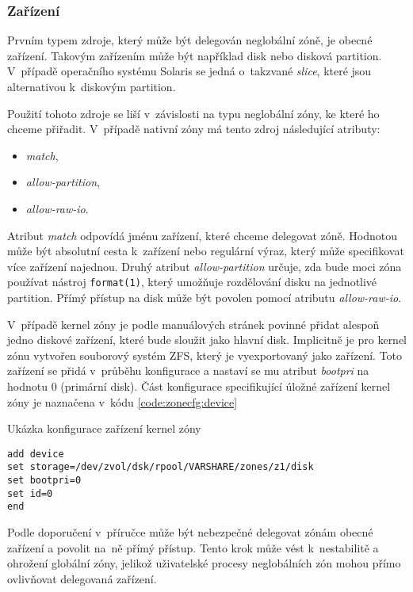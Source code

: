 \subsubsection{Zařízení}
\label{chapter:zones:configuration:resources:device}
Prvním typem zdroje, který může být delegován neglobální zóně, je obecné zařízení. Takovým zařízením může být například disk
nebo disková partition. V~případě operačního systému Solaris se jedná o~takzvané \textit{slice}, které jsou alternativou k~diskovým 
partition. 

Použití tohoto zdroje se liší v~závislosti na typu neglobální zóny, ke které ho chceme přiřadit. V~případě nativní zóny má tento
zdroj následující  atributy:
\begin{itemize}
 \item \textit{match},
 \item \textit{allow-partition},
 \item \textit{allow-raw-io}.
\end{itemize}
Atribut \textit{match} odpovídá jménu zařízení, které chceme delegovat zóně. Hodnotou může být absolutní cesta k~zařízení nebo
regulární výraz, který může specifikovat více zařízení najednou. Druhý atribut \textit{allow-partition} určuje, zda 
bude moci zóna používat nástroj \verb|format(1)|, který umožňuje rozdělování disku na jednotlivé partition. Přímý přístup na disk
může být povolen pomocí atributu \textit{allow-raw-io}.

V~případě kernel zóny je podle manuálových stránek \cite{oracle:manpages:solaris-kz} povinné přidat alespoň jedno diskové zařízení,
které bude sloužit jako hlavní disk. Implicitně je pro kernel zónu vytvořen souborový systém ZFS, který je vyexportovaný jako
zařízení. Toto zařízení se přidá v~průběhu konfigurace a nastaví se mu atribut \textit{bootpri} na hodnotu 0 (primární disk).
Část konfigurace specifikující úložné zařízení kernel zóny je naznačena v~kódu \ref{code:zonecfg:device}
\begin{listing}
  \caption{Ukázka konfigurace zařízení kernel zóny}
  \label{code:zonecfg:device}
  \begin{verbatim}
add device
set storage=/dev/zvol/dsk/rpool/VARSHARE/zones/z1/disk
set bootpri=0
set id=0
end   
  \end{verbatim}
\end{listing}
Podle doporučení v~příručce \cite{oracle:manpages:zonecfg} může být nebezpečné delegovat zónám obecné zařízení a povolit na~ně přímý
přístup. Tento krok může vést k~nestabilitě a ohrožení globální zóny, jelikož uživatelské procesy neglobálních zón mohou
přímo ovlivňovat delegovaná zařízení.
